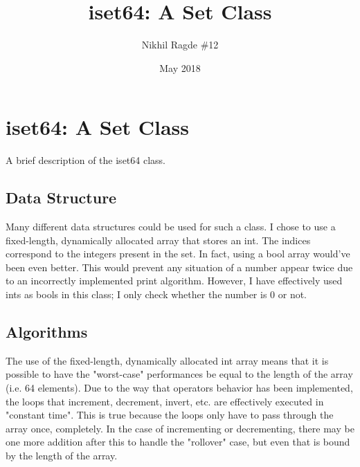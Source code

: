 \documentclass[12pt, letterpaper]{article}
\title{iset64: A Set Class}
\author{Nikhil Ragde \#12}
\date{May 2018}
\begin{document}
\section*{iset64: A Set Class}
A brief description of the iset64 class.
\setcounter{section}{1}
\subsection{Data Structure}
Many different data structures could be used for such a class. I chose to use a fixed-length, dynamically allocated array that stores an int. The indices correspond to the integers present in the set. In fact, using a bool array would've been even better. This would prevent any situation of a number appear twice due to an incorrectly implemented print algorithm. However, I have effectively used ints as bools in this class; I only check whether the number is 0 or not.
\subsection{Algorithms}
The use of the fixed-length, dynamically allocated int array means that it is possible to have the "worst-case" performances be equal to the length of the array (i.e. 64 elements). Due to the way that operators behavior has been implemented, the loops that increment, decrement, invert, etc. are effectively executed in "constant time". This is true because the loops only have to pass through the array once, completely. In the case of incrementing or decrementing, there may be one more addition after this to handle the "rollover" case, but even that is bound by the length of the array.
\end{document}
